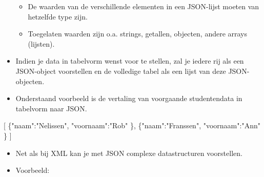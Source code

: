\documentclass[]{tufte-book}
\newenvironment{Shaded}{}{}
\newcommand{\DataTypeTok}[1]{\textcolor[rgb]{0.56,0.13,0.00}{#1}}
\newcommand{\FunctionTok}[1]{\textcolor[rgb]{0.02,0.16,0.49}{#1}}
\newcommand{\OtherTok}[1]{\textcolor[rgb]{0.00,0.44,0.13}{#1}}
\newcommand{\StringTok}[1]{\textcolor[rgb]{0.25,0.44,0.63}{#1}}
\providecommand{\tightlist}{%
  \setlength{\itemsep}{0pt}\setlength{\parskip}{0pt}}
\begin{document}
\begin{itemize}
  \begin{itemize}
  \tightlist
  \item
    De waarden van de verschillende elementen in een JSON-lijst moeten van hetzelfde type zijn.
  \item
    Toegelaten waarden zijn o.a. strings, getallen, objecten, andere arrays (lijsten).
  \end{itemize}
\item
  Indien je data in tabelvorm wenst voor te stellen, zal je iedere rij als een JSON-object voorstellen en de volledige tabel als een lijst van deze JSON-objecten.
\item
  Onderstaand voorbeeld is de vertaling van voorgaande studentendata in tabelvorm naar JSON.
\end{itemize}

\begin{Shaded}
\begin{Highlighting}[]
\OtherTok{[}
  \FunctionTok{\{}\DataTypeTok{"naam"}\FunctionTok{:}\StringTok{"Nelissen"}\FunctionTok{,} 
   \DataTypeTok{"voornaam"}\FunctionTok{:}\StringTok{"Rob"} 
  \FunctionTok{\}}\OtherTok{,} 
  \FunctionTok{\{}\DataTypeTok{"naam"}\FunctionTok{:}\StringTok{"Franssen"}\FunctionTok{,} 
   \DataTypeTok{"voornaam"}\FunctionTok{:}\StringTok{"Ann"}
  \FunctionTok{\}}
\OtherTok{]}
\end{Highlighting}
\end{Shaded}

\begin{itemize}
\tightlist
\item
  Net als bij XML kan je met JSON complexe datastructuren voorstellen.
\item
  Voorbeeld:
\end{itemize}
\end{document}
